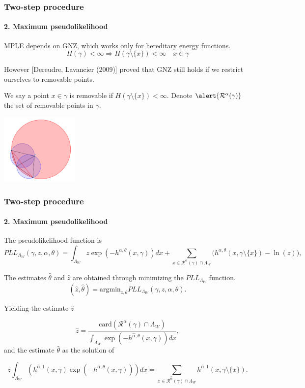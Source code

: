\documentclass[c, 10pt]{beamer}
\begin{document}
\begin{frame}\frametitle{Two-step procedure}\framesubtitle{2. Maximum pseudolikelihood}
MPLE depends on GNZ, which works only for \alert{hereditary} energy functions.
$$H(\gamma) < \infty \Rightarrow H(\gamma \setminus \{x\}) < \infty \quad x \in \gamma$$

However [Dereudre, Lavancier (2009)] proved that GNZ still holds if we restrict ourselves to \alert{removable points}.\newline

We say a point $x\in \gamma$ is removable if $H(\gamma \setminus \{x\}) < \infty$. Denote $\alert {\mathcal R^\alpha(\gamma)}$ the set of removable points in $\gamma$. 

\begin{center}
\includegraphics[height = 3.5cm]{./FigureLayout/hereditarity.png}
\end{center}

\end{frame}

\begin{frame}\frametitle{Two-step procedure}\framesubtitle{2. Maximum pseudolikelihood}
\begin{small}
The pseudolikelihood function is
$$ PLL_{\Lambda_W}(\gamma,z,\alpha, \theta) = \int_{\Lambda_W } z \exp (-h^{\alpha,\theta}(x,\gamma)) dx + \sum_{x\in\mathcal R^\alpha(\gamma)\cap \Lambda_W } \big(h^{\alpha,\theta}(x,\gamma\setminus\{x\}) - \ln(z)\big),
$$


The estimates $\hat\theta$ and $\hat z$ are obtained through minimizing the $PLL_{\Lambda_W }$ function. 
$$(\hat z, \hat\theta) = \text{argmin}_{z,\theta} PLL_{\Lambda_W } (\gamma, z, \hat\alpha,\theta).$$

Yielding the estimate $\hat z$ 

$$\hat z = \frac{\mbox{card}(\mathcal R^\alpha(\gamma)\cap \Lambda_W)}{\int_{\Lambda_W} \exp{\left( -h^{\hat\alpha,\theta}(x,\gamma)\right)} dx},$$
and the estimate $\hat\theta$ as the solution of

$$z \int_{\Lambda_W} (h^{\hat\alpha,1}(x,\gamma)\exp{\left(-h^{\hat\alpha,\theta}(x,\gamma)\right)}) dx = \sum_{x \in \mathcal R^{\hat\alpha}(\gamma)\cap \Lambda_W} h^{\hat\alpha,1}(x,\gamma\setminus\{x\}).$$

\end{small}
\end{frame}
\end{document}
